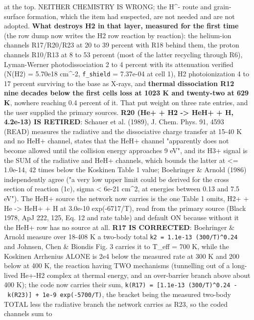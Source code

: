 \documentclass[english,a4paper]{my_memo}
\begin{document}
\begin{itemize}
{  at the top}. NEITHER CHEMISTRY IS WRONG; the H\^{}- route and grain-surface
  formation, which the item had suspected, are not needed and are not adopted.
  \textbf{What destroys H2 in that layer, measured for the first time} (the row dump
  now writes the H2 row reaction by reaction): the helium-ion channels
  R17/R20/R23 at 20 to 39 percent with R18 behind them, the proton channels
  R10/R13 at 8 to 53 percent (most of the latter recycling through R6),
  Lyman-Werner photodissociation 2 to 4 percent with its attenuation verified
  (N(H2) = 5.70e18 cm\^{}-2, \texttt{f\_shield} = 7.37e-04 at cell 1), H2
  photoionization 4 to 17 percent surviving to the base as X-rays, and
  \textbf{thermal dissociation R12 nine decades below the first cell\textquotesingle s loss at
  1023 K and twenty-two at 629 K}, nowhere reaching 0.4 percent of it. That
  put weight on three rate entries, and the user supplied the primary sources.
  \textbf{R20 (He+ + H2 -\textgreater{} HeH+ + H, 4.2e-13) IS RETIRED}: Schauer et al. (1989),
  J. Chem. Phys. 91, 4593 (READ) measures the radiative and the dissociative
  charge transfer at 15-40 K and no HeH+ channel, states that the HeH+ channel
  "apparently does not become allowed until the collision energy approaches
  9 eV", and its H3+ signal is the SUM of the radiative and HeH+ channels,
  which bounds the latter at \textless= 1.0e-14, 42 times below the Koskinen Table 1
  value; Boehringer \& Arnold (1986) independently agree ("a very low upper
  limit could be derived for the cross section of reaction (1c),
  sigma \textless{} 6e-21 cm\^{}2, at energies between 0.13 and 7.5 eV"). The HeH+ source
  the network now carries is the one Table 1 omits, H2+ + He -\textgreater{} HeH+ + H at
  3.0e-10 exp(-6717/T), read from the primary source (Black 1978, ApJ 222, 125,
  Eq. 12 and rate table) and default ON because without it the HeH+ row has no
  source at all. \textbf{R17 IS CORRECTED}: Boehringer \& Arnold measure over 18-408
  K a two-body total \texttt{k2\ =\ 1.1e-13\ (300/T)\^{}0.24} and Johnsen, Chen \& Biondi\textquotesingle s
  Fig. 3 carries it to T\_eff = 700 K, while the Koskinen Arrhenius ALONE is
  2e4 below the measured rate at 300 K and 200 below at 400 K, the reaction
  having TWO mechanisms (tunnelling out of a long-lived He+-H2 complex at
  thermal energy, and an over-barrier branch above about 400 K); the code now
  carries their sum, \texttt{k(R17)\ =\ {[}1.1e-13\ (300/T)\^{}0.24\ -\ k(R23){]}\ +\ 1e-9\ exp(-5700/T)}, the bracket being the measured two-body TOTAL less the
  radiative branch the network carries as R23, so the coded channels sum to

\end{itemize}
\end{document}
